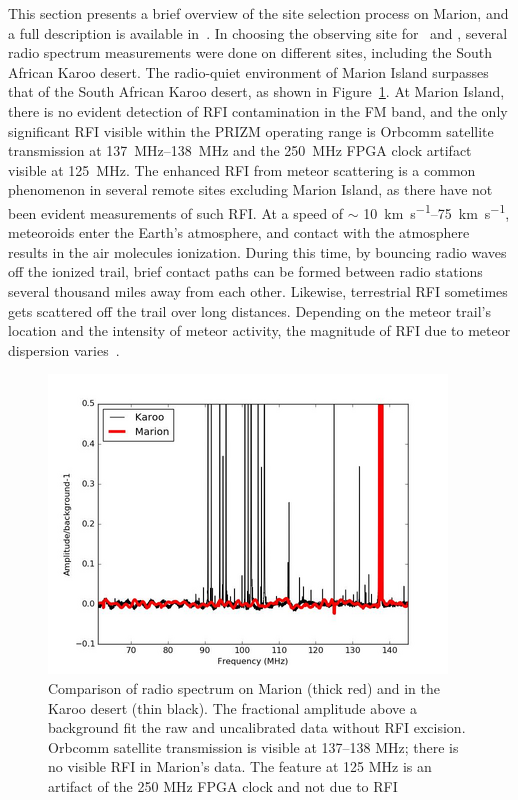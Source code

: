 This section presents a brief overview of the site selection process on Marion, and a full description is available in~\citet{2019JAI.....850004P}. In choosing the observing site for \prizm\ and \albatros, several radio spectrum measurements were done on different sites, including the South African Karoo desert. The radio-quiet environment of Marion Island surpasses that of the South African Karoo desert, as shown in Figure~\ref{fig:karoo}. At Marion Island, there is no evident detection of RFI contamination in the FM band, and the only significant RFI visible within the PRIZM operating range is Orbcomm satellite transmission at \SIrange{137}{138}{\mega\hertz} and the \SI{250}{\mega\hertz} FPGA clock artifact visible at \SI{125}{\mega\hertz}. The enhanced RFI from meteor scattering is a common phenomenon in several remote sites excluding Marion Island, as there have not been evident measurements of such RFI. At a speed of $\sim$ \SIrange{10}{75}{\kilo \meter \per \second}, meteoroids enter the Earth's atmosphere, and contact with the atmosphere results in the air molecules ionization. During this time, by bouncing radio waves off the ionized trail, brief contact paths can be formed between radio stations several thousand miles away from each other. Likewise, terrestrial RFI sometimes gets scattered off the trail over long distances. Depending on the meteor trail's location and the intensity of meteor activity, the magnitude of RFI due to meteor dispersion varies~\citep{1996pimo.conf...99W}.

\begin{figure}
	\centering
	\includegraphics[width=\linewidth]{Figures/karoo}
	\caption{Comparison of radio spectrum on Marion (thick red) and in the Karoo desert (thin black). The fractional amplitude above a background fit the raw and uncalibrated data without RFI excision. Orbcomm satellite transmission is visible at 137–138 MHz; there is no visible RFI in Marion's data. The feature at 125 MHz is an artifact of the 250 MHz FPGA clock and not due to RFI~\citep{2019JAI.....850004P}}
	\label{fig:karoo}
\end{figure}

